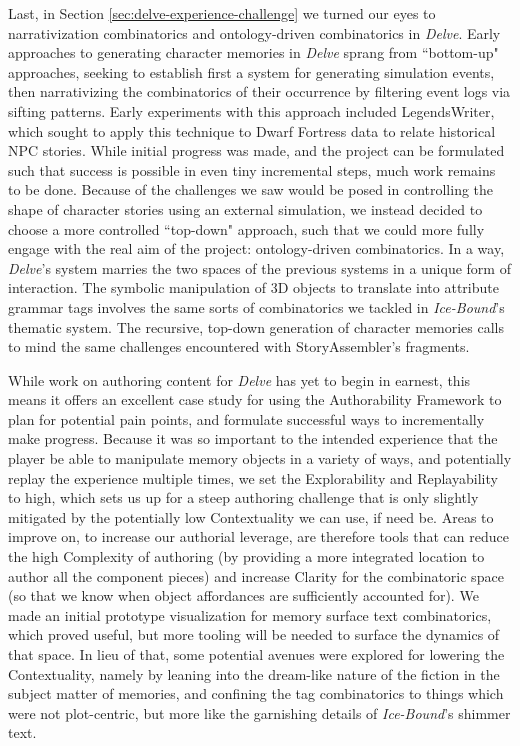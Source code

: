 Last, in Section \ref{sec:delve-experience-challenge} we turned our eyes to narrativization combinatorics and ontology-driven combinatorics in \textit{Delve}. Early approaches to generating character memories in \textit{Delve} sprang from ``bottom-up" approaches, seeking to establish first a system for generating simulation events, then narrativizing the combinatorics of their occurrence by filtering event logs via sifting patterns. Early experiments with this approach included LegendsWriter, which sought to apply this technique to Dwarf Fortress data to relate historical NPC stories. While initial progress was made, and the project can be formulated such that success is possible in even tiny incremental steps, much work remains to be done. Because of the challenges we saw would be posed in controlling the shape of character stories using an external simulation, we instead decided to choose a more controlled ``top-down" approach, such that we could more fully engage with the real aim of the project: ontology-driven combinatorics. In a way, \textit{Delve}'s system marries the two spaces of the previous systems in a unique form of interaction. The symbolic manipulation of 3D objects to translate into attribute grammar tags involves the same sorts of combinatorics we tackled in \textit{Ice-Bound}’s thematic system. The recursive, top-down generation of character memories calls to mind the same challenges encountered with StoryAssembler's fragments.

While work on authoring content for \textit{Delve} has yet to begin in earnest, this means it offers an excellent case study for using the Authorability Framework to plan for potential pain points, and formulate successful ways to incrementally make progress. Because it was so important to the intended experience that the player be able to manipulate memory objects in a variety of ways, and potentially replay the experience multiple times, we set the Explorability and Replayability to high, which sets us up for a steep authoring challenge that is only slightly mitigated by the potentially low Contextuality we can use, if need be. Areas to improve on, to increase our authorial leverage, are therefore tools that can reduce the high Complexity of authoring (by providing a more integrated location to author all the component pieces) and increase Clarity for the combinatoric space (so that we know when object affordances are sufficiently accounted for). We made an initial prototype visualization for memory surface text combinatorics, which proved useful, but more tooling will be needed to surface the dynamics of that space. In lieu of that, some potential avenues were explored for lowering the Contextuality, namely by leaning into the dream-like nature of the fiction in the subject matter of memories, and confining the tag combinatorics to things which were not plot-centric, but more like the garnishing details of \textit{Ice-Bound}'s shimmer text.

